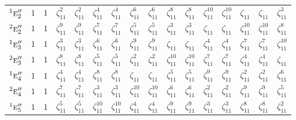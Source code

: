 \documentclass[10pt,a4paper]{article}
\numberwithin{equation}{section}
\newcommand{\irr}[1]{\text{\normalfont\scshape #1}}
\newcommand{\conjpair}[1]{{}^{#1}}
\newcommand{\rootunity}[1]{\zeta_{#1}}
\begin{document}
{\begin{longtable}{@{}lccccccccccccccc@{}}
$\conjpair{1}\irr{e}_{2}''$ & $1$ & $1$ & $\rootunity{11}^{2}$ & $\rootunity{11}^{2}$ & $\rootunity{11}^{4}$ & $\rootunity{11}^{4}$ & $\rootunity{11}^{6}$ & $\rootunity{11}^{6}$ & $\rootunity{11}^{8}$ & $\rootunity{11}^{8}$ & $\rootunity{11}^{10}$ & $\rootunity{11}^{10}$ & $\rootunity{11}$ & $\rootunity{11}$ & $\rootunity{11}^{3}$\\
$\conjpair{2}\irr{e}_{2}''$ & $1$ & $1$ & $\rootunity{11}^{9}$ & $\rootunity{11}^{9}$ & $\rootunity{11}^{7}$ & $\rootunity{11}^{7}$ & $\rootunity{11}^{5}$ & $\rootunity{11}^{5}$ & $\rootunity{11}^{3}$ & $\rootunity{11}^{3}$ & $\rootunity{11}$ & $\rootunity{11}$ & $\rootunity{11}^{10}$ & $\rootunity{11}^{10}$ & $\rootunity{11}^{8}$\\
$\conjpair{1}\irr{e}_{3}''$ & $1$ & $1$ & $\rootunity{11}^{3}$ & $\rootunity{11}^{3}$ & $\rootunity{11}^{6}$ & $\rootunity{11}^{6}$ & $\rootunity{11}^{9}$ & $\rootunity{11}^{9}$ & $\rootunity{11}$ & $\rootunity{11}$ & $\rootunity{11}^{4}$ & $\rootunity{11}^{4}$ & $\rootunity{11}^{7}$ & $\rootunity{11}^{7}$ & $\rootunity{11}^{10}$\\
$\conjpair{2}\irr{e}_{3}''$ & $1$ & $1$ & $\rootunity{11}^{8}$ & $\rootunity{11}^{8}$ & $\rootunity{11}^{5}$ & $\rootunity{11}^{5}$ & $\rootunity{11}^{2}$ & $\rootunity{11}^{2}$ & $\rootunity{11}^{10}$ & $\rootunity{11}^{10}$ & $\rootunity{11}^{7}$ & $\rootunity{11}^{7}$ & $\rootunity{11}^{4}$ & $\rootunity{11}^{4}$ & $\rootunity{11}$\\
$\conjpair{1}\irr{e}_{4}''$ & $1$ & $1$ & $\rootunity{11}^{4}$ & $\rootunity{11}^{4}$ & $\rootunity{11}^{8}$ & $\rootunity{11}^{8}$ & $\rootunity{11}$ & $\rootunity{11}$ & $\rootunity{11}^{5}$ & $\rootunity{11}^{5}$ & $\rootunity{11}^{9}$ & $\rootunity{11}^{9}$ & $\rootunity{11}^{2}$ & $\rootunity{11}^{2}$ & $\rootunity{11}^{6}$\\
$\conjpair{2}\irr{e}_{4}''$ & $1$ & $1$ & $\rootunity{11}^{7}$ & $\rootunity{11}^{7}$ & $\rootunity{11}^{3}$ & $\rootunity{11}^{3}$ & $\rootunity{11}^{10}$ & $\rootunity{11}^{10}$ & $\rootunity{11}^{6}$ & $\rootunity{11}^{6}$ & $\rootunity{11}^{2}$ & $\rootunity{11}^{2}$ & $\rootunity{11}^{9}$ & $\rootunity{11}^{9}$ & $\rootunity{11}^{5}$\\
$\conjpair{1}\irr{e}_{5}''$ & $1$ & $1$ & $\rootunity{11}^{5}$ & $\rootunity{11}^{5}$ & $\rootunity{11}^{10}$ & $\rootunity{11}^{10}$ & $\rootunity{11}^{4}$ & $\rootunity{11}^{4}$ & $\rootunity{11}^{9}$ & $\rootunity{11}^{9}$ & $\rootunity{11}^{3}$ & $\rootunity{11}^{3}$ & $\rootunity{11}^{8}$ & $\rootunity{11}^{8}$ & $\rootunity{11}^{2}$\\

\end{longtable}}
\end{document}
